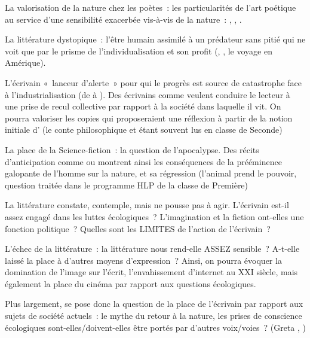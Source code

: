 {La valorisation de la nature chez les poètes~: les particularités de l'art poétique au service
d'une sensibilité exacerbée vis-à-vis de la nature~: , , .

La littérature dystopique~: l'être humain assimilé à un prédateur sans pitié qui ne voit que par
le prisme de l'individualisation et son profit (, , le voyage en
Amérique).

L'écrivain «~lanceur d'alerte~» pour qui le progrès est source de catastrophe face à
l'industrialisation (de  à ). Des écrivains comme  veulent conduire le
lecteur à une prise de recul collective par rapport à la société dans laquelle il vit. On pourra
valoriser les copies qui proposeraient une réflexion à partir de la notion initiale d' (le
conte philosophique et  étant souvent lus en classe de Seconde)

La place de la Science-fiction~: la question de l'apocalypse. Des récits d'anticipation comme
 ou  montrent ainsi les conséquences de la prééminence
galopante de l'homme sur la nature, et sa régression (l'animal prend le pouvoir, question
traitée dans le programme HLP de la classe de Première)

La littérature constate, contemple, mais ne pousse pas à agir. L'écrivain est-il assez engagé
dans les luttes écologiques~? L'imagination et la fiction ont-elles une fonction politique~?
Quelles sont les LIMITES de l'action de l'écrivain~?

L'échec de la littérature~: la littérature nous rend-elle ASSEZ sensible~? A-t-elle laissé la place
à d'autres moyens d'expression~? Ainsi, on pourra évoquer la domination de l'image sur l'écrit,
l'envahissement d'internet au XXI\ieme{} siècle, mais également la place du cinéma par rapport aux
questions écologiques.

Plus largement, se pose donc la question de la place de l'écrivain par rapport aux sujets de
société actuels~: le mythe du retour à la nature, les prises de conscience écologiques sont-elles/doivent-elles être portés par d'autres voix/voies~? (Greta , )}

